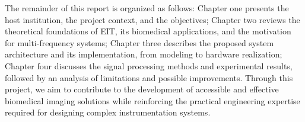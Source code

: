 The remainder of this report is organized as follows: Chapter one presents the host institution, the project context, and the objectives; Chapter two reviews the theoretical foundations of EIT, its biomedical applications, and the motivation for multi-frequency systems; Chapter three describes the proposed system architecture and its implementation, from modeling to hardware realization; Chapter four discusses the signal processing methods and experimental results, followed by an analysis of limitations and possible improvements. Through this project, we aim to contribute to the development of accessible and effective biomedical imaging solutions while reinforcing the practical engineering expertise required for designing complex instrumentation systems.

